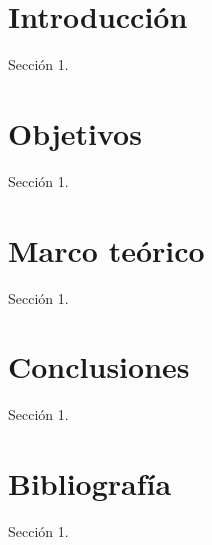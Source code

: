 \documentclass[12pt]{article}
\begin{document}
    

    \tableofcontents
    \newpage

    \section{Introducción}
        Sección 1.

    \section{Objetivos}
        Sección 1.

    \section{Marco teórico}
        Sección 1.

    \section{Conclusiones}
        Sección 1.

    \section{Bibliografía}
        Sección 1.
        
\end{document}
